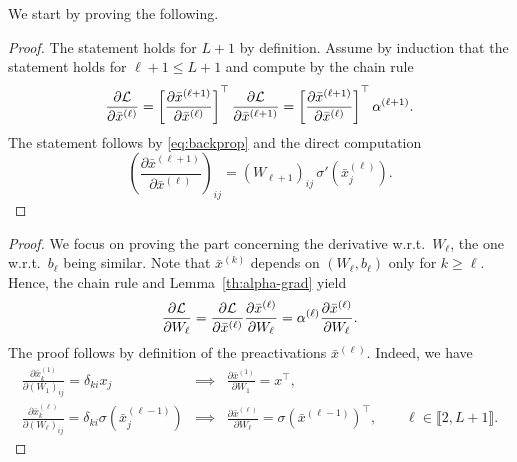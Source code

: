 We start by proving the following.

\begin{proof}
    The statement holds for $L+1$ by definition. Assume by induction that the statement holds for $\ell+1\le L+1$ and compute by the chain rule 
    \begin{equation}
        \frac{\partial\mathcal{L}}{\partial \bar x^{(\ell)}} = 
        \left[\frac{\partial\bar x^{(\ell+1)}}{\partial \bar x^{(\ell)}} \right]^\top
        \frac{\partial\mathcal{L}}{\partial \bar x^{(\ell+1)}} = 
        \left[\frac{\partial\bar x^{(\ell+1)}}{\partial \bar x^{(\ell)}} \right]^\top
        \alpha^{(\ell+1)}.
    \end{equation} 
    The statement follows by \eqref{eq:backprop} and the direct computation
    \begin{equation}
        \left(\frac{\partial\bar x^{(\ell+1)}}{\partial \bar x^{(\ell)}}\right)_{ij} = (W_{\ell+1})_{ij}\,\sigma'(\bar x^{(\ell)}_j).
    \end{equation}
\end{proof}

\begin{proof}
   We focus on proving the part concerning the derivative w.r.t.~$W_\ell$, the one w.r.t.~$b_\ell$ being similar.
   Note that $\bar x^{(k)}$ depends on $(W_\ell,b_\ell)$ only for $k \ge \ell$. Hence, the chain rule and Lemma~\ref{th:alpha-grad} yield
   \begin{equation}
    \frac{\partial\mathcal{L}}{\partial W_\ell}=\frac{\partial\mathcal{L}}{\partial \bar x^{(\ell)}}\frac{\partial\bar x^{(\ell)}}{\partial W_\ell}
    =\alpha^{(\ell)}\frac{\partial\bar x^{(\ell)}}{\partial W_\ell}.
   \end{equation}
   The proof follows by definition of the preactivations $\bar x^{(\ell)}$. Indeed, we have
   \begin{eqnarray}
    \frac{\partial \bar x^{(1)}_k}{\partial (W_1)_{ij}} = \delta_{ki} x_j
    &\implies&
    \frac{\partial \bar x^{(1)}}{\partial W_1} = x^\top,\\
    \frac{\partial \bar x^{(\ell)}_k}{\partial (W_\ell)_{ij}} = \delta_{ki}\sigma(\bar x^{(\ell-1)}_j)
    &\implies&
    \frac{\partial \bar x^{(\ell)}}{\partial W_\ell} = \sigma(\bar x^{(\ell-1)})^\top
    , \qquad \ell\in \llbracket 2,L+1\rrbracket. 
   \end{eqnarray}
\end{proof}

